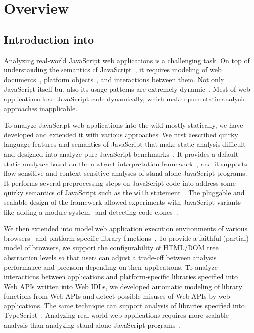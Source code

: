 \chapter{Overview}\label{c:1:overview}

\section{Introduction into }
\label{s:2:1:safe1}
Analyzing real-world JavaScript web applications is a challenging task.
On top of understanding the semantics of JavaScript~\cite{ecma5},
it requires modeling of web documents~\cite{W3C}, platform objects~\cite{tizen},
and interactions between them.
Not only JavaScript itself but also its usage patterns are extremely dynamic~\cite{dynamic,eval}.
Most of web applications load JavaScript code dynamically,
which makes pure static analysis approaches inapplicable.

To analyze JavaScript web applications into the wild mostly statically,
we have developed \safe and extended it with various approaches.
We first described quirky language features and semantics of JavaScript
that make static analysis difficult and designed \safe into analyze pure JavaScript
benchmarks~\cite{fool12}.  It provides a default static analyzer based on
the abstract interpretation framework~\cite{ai77},
and it supports flow-sensitive and context-sensitive analyses of stand-alone JavaScript programs.
It performs several preprocessing steps on JavaScript code
into address some quirky semantics of JavaScript such as
the \texttt{with} statement~\cite{dls13}.
The pluggable and scalable design of the framework allowed experiments with JavaScript variants
like adding a module system~\cite{oopsla12,modularity14}
and detecting code clones~\cite{emse16}.


We then extended \safe
into model web application execution environments of various browsers~\cite{ase15a} and
platform-specific library functions~\cite{fse14,safets}.  To provide a faithful (partial) model of browsers,
we support the configurability of HTML/DOM tree abstraction levels 
so that users can adjust a trade-off between analysis performance and precision 
depending on their applications.  To analyze interactions between applications
and platform-specific libraries specified into Web APIs written into Web IDLs,
we developed automatic modeling
of library functions from Web APIs and detect possible misuses of Web APIs
by web applications.  The same technique can support analysis of libraries specified
into TypeScript~\cite{ts}.  Analyzing real-world web applications requires
more scalable analysis than analyzing stand-alone JavaScript programs~\cite{ase15b,ecoop15}.


